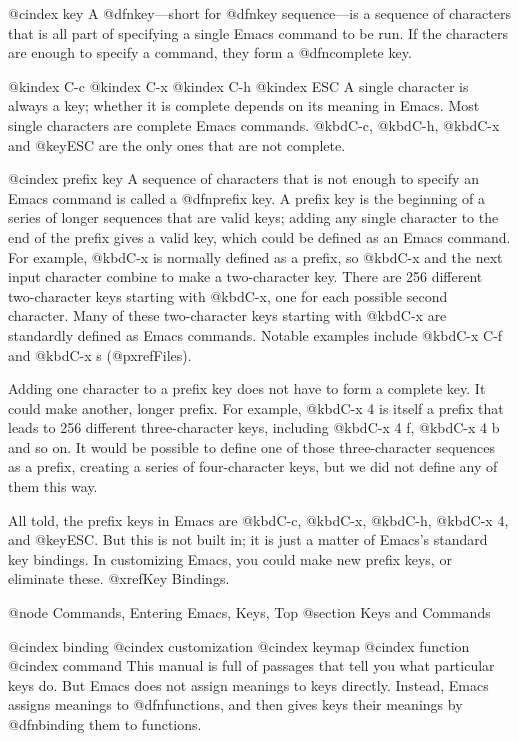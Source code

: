 {{@cindex key
  A @dfn{key}---short for @dfn{key sequence}---is a sequence of characters
that is all part of specifying a single Emacs command to be run.  If the
characters are enough to specify a command, they form a @dfn{complete key}.

@kindex C-c
@kindex C-x
@kindex C-h
@kindex ESC
  A single character is always a key; whether it is complete depends on its
meaning in Emacs.  Most single characters are complete Emacs commands.
@kbd{C-c}, @kbd{C-h}, @kbd{C-x} and @key{ESC} are the only ones that are not complete.

@cindex prefix key
  A sequence of characters that is not enough to specify an Emacs command
is called a @dfn{prefix key}.  A prefix key is the beginning of a series of
longer sequences that are valid keys; adding any single character to the
end of the prefix gives a valid key, which could be defined as an Emacs
command.  For example, @kbd{C-x} is normally defined as a prefix, so
@kbd{C-x} and the next input character combine to make a two-character key.
There are 256 different two-character keys starting with @kbd{C-x}, one for
each possible second character.  Many of these two-character keys starting
with @kbd{C-x} are standardly defined as Emacs commands.  Notable examples
include @kbd{C-x C-f} and @kbd{C-x s} (@pxref{Files}).

  Adding one character to a prefix key does not have to form a complete
key.  It could make another, longer prefix.  For example, @kbd{C-x 4} is
itself a prefix that leads to 256 different three-character keys, including
@kbd{C-x 4 f}, @kbd{C-x 4 b} and so on.  It would be possible to define one
of those three-character sequences as a prefix, creating a series of
four-character keys, but we did not define any of them this way.

  All told, the prefix keys in Emacs are @kbd{C-c}, @kbd{C-x}, @kbd{C-h},
@kbd{C-x 4}, and @key{ESC}.  But this is not built in; it is just a matter
of Emacs's standard key bindings.  In customizing Emacs, you could make
new prefix keys, or eliminate these.  @xref{Key Bindings}.

@node Commands, Entering Emacs, Keys, Top
@section Keys and Commands

@cindex binding
@cindex customization
@cindex keymap
@cindex function
@cindex command
  This manual is full of passages that tell you what particular keys do.
But Emacs does not assign meanings to keys directly.  Instead, Emacs
assigns meanings to @dfn{functions}, and then gives keys their meanings by
@dfn{binding} them to functions. 

}}
